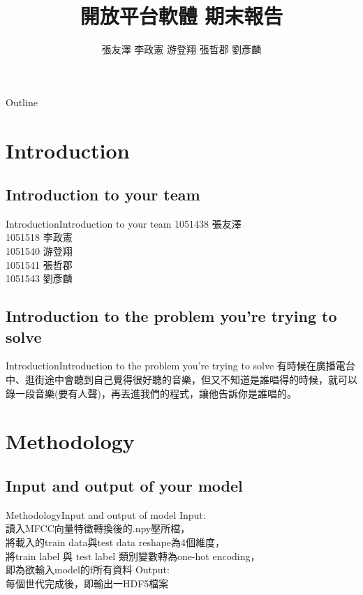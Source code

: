 \documentclass{beamer}
\begin{document}
\begin{CJK}{UTF8}{nkai}
\title{開放平台軟體 期末報告}
\author{張友澤  李政憲  游登翔  張哲郡  劉彥麟}

\begin{frame}
  \titlepage
\end{frame}

\begin{frame}{Outline}
\tiny{\tableofcontents}
\end{frame}

\section{Introduction}
\subsection{Introduction to your team}
\begin{frame}{Introduction}{Introduction to your team}
	1051438 張友澤\\
	1051518 李政憲\\ 
	1051540 游登翔\\ 
	1051541 張哲郡\\ 
	1051543 劉彥麟\\
 \end{frame}
\subsection{Introduction to the problem you're trying to solve}
\begin{frame}{Introduction}{Introduction to the problem you're trying to solve}
	有時候在廣播電台中、逛街途中會聽到自己覺得很好聽的音樂，但又不知道是誰唱得的時候，就可以錄一段音樂(要有人聲)，再丟進我們的程式，讓他告訴你是誰唱的。
 \end{frame}

\section{Methodology}
\subsection{Input and output of your model}
\begin{frame}{Methodology}{Input and output of model}
	Input:\\
	讀入MFCC向量特徵轉換後的.npy壓所檔，\\
	將載入的train data與test data reshape為4個維度，\\
	將train label 與 test label 類別變數轉為one-hot encoding，\\
	即為欲輸入model的f所有資料\newline\newline
	Output:\\
	每個世代完成後，即輸出一HDF5檔案\\
	

\end{frame}
\end{CJK}
\end{document}
